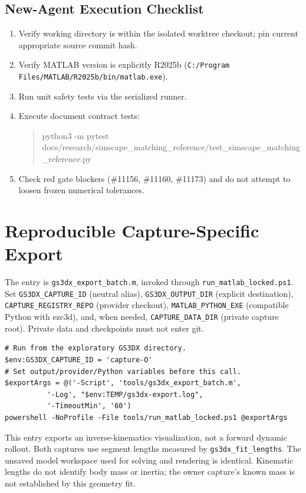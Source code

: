 \documentclass[11pt,a4paper]{article}
\begin{document}
\subsection{New-Agent Execution Checklist}
\begin{enumerate}
    \item Verify working directory is within the isolated worktree checkout; pin current appropriate source commit hash.
    \item Verify MATLAB version is explicitly R2025b (\nolinkurl{C:/Program Files/MATLAB/R2025b/bin/matlab.exe}).
    \item Run unit safety tests via the serialized runner.
    \item Execute document contract tests:
    \begin{quote}\footnotesize\ttfamily
    python3 -m pytest \\
    docs/research/simscape\_matching\_reference/test\_simscape\_matching\_reference.py
    \end{quote}
    \item Check red gate blockers (\#11156, \#11160, \#11173) and do not attempt to loosen frozen numerical tolerances.
\end{enumerate}



\section{Reproducible Capture-Specific Export}

The entry is \texttt{gs3dx\_export\_batch.m}, invoked through
\texttt{run\_matlab\_locked.ps1}. Set
\nolinkurl{GS3DX_CAPTURE_ID} (neutral alias),
\nolinkurl{GS3DX_OUTPUT_DIR} (explicit destination),
\nolinkurl{CAPTURE_REGISTRY_REPO} (provider checkout),
\nolinkurl{MATLAB_PYTHON_EXE} (compatible Python with ezc3d), and, when needed,
\nolinkurl{CAPTURE_DATA_DIR} (private capture root).
Private data and checkpoints must not enter git.
\begin{verbatim}
# Run from the exploratory GS3DX directory.
$env:GS3DX_CAPTURE_ID = 'capture-O'
# Set output/provider/Python variables before this call.
$exportArgs = @('-Script', 'tools/gs3dx_export_batch.m',
          '-Log', "$env:TEMP/gs3dx-export.log",
          '-TimeoutMin', '60')
powershell -NoProfile -File tools/run_matlab_locked.ps1 @exportArgs
\end{verbatim}

This entry exports an inverse-kinematics visualization, not a forward dynamic
rollout. Both captures use segment lengths measured by
\texttt{gs3dx\_fit\_lengths}. The unsaved model workspace used for solving and
rendering is identical. Kinematic lengths do not identify body mass or inertia;
the owner capture's known mass is not established by this geometry fit.
\end{document}
